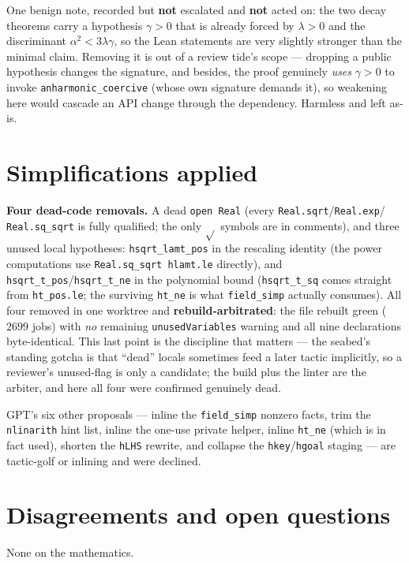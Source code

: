 \documentclass[11pt]{article}
\begin{document}
One benign note, recorded but \textbf{not} escalated and \textbf{not} acted on: the two decay theorems carry a
hypothesis $\gamma>0$ that is already forced by $\lambda>0$ and the discriminant $\alpha^2<3\lambda\gamma$, so
the Lean statements are very slightly stronger than the minimal claim. Removing it is out of a review tide's
scope --- dropping a public hypothesis changes the signature, and besides, the proof genuinely \emph{uses}
$\gamma>0$ to invoke \texttt{anharmonic\_coercive} (whose own signature demands it), so weakening here would
cascade an API change through the dependency. Harmless and left as-is.

\section{Simplifications applied}
\textbf{Four dead-code removals.} A dead \texttt{open Real} (every \texttt{Real.sqrt}/\texttt{Real.exp}/%
\texttt{Real.sq\_sqrt} is fully qualified; the only $\sqrt{}$ symbols are in comments), and three unused local
hypotheses: \texttt{hsqrt\_lamt\_pos} in the rescaling identity (the power computations use
\texttt{Real.sq\_sqrt hlamt.le} directly), and \texttt{hsqrt\_t\_pos}/\texttt{hsqrt\_t\_ne} in the polynomial
bound (\texttt{hsqrt\_t\_sq} comes straight from \texttt{ht\_pos.le}; the surviving \texttt{ht\_ne} is what
\texttt{field\_simp} actually consumes). All four removed in one worktree and \textbf{rebuild-arbitrated}: the
file rebuilt green ($2699$ jobs) with \emph{no} remaining \texttt{unusedVariables} warning and all nine
declarations byte-identical. This last point is the discipline that matters --- the seabed's standing gotcha is
that ``dead'' locals sometimes feed a later tactic implicitly, so a reviewer's unused-flag is only a candidate;
the build plus the linter are the arbiter, and here all four were confirmed genuinely dead.

GPT's six other proposals --- inline the \texttt{field\_simp} nonzero facts, trim the \texttt{nlinarith} hint
list, inline the one-use private helper, inline \texttt{ht\_ne} (which is in fact used), shorten the
\texttt{hLHS} rewrite, and collapse the \texttt{hkey}/\texttt{hgoal} staging --- are tactic-golf or inlining and
were declined.

\section{Disagreements and open questions}
None on the mathematics.
\end{document}
